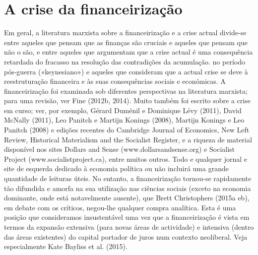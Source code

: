 \section{A crise da financeirização}
 \par 
Em geral, a literatura marxista sobre a financeirização e a crise actual divide-se entre aqueles que pensam que as finanças são cruciais e aqueles que pensam que não o são, e entre aqueles que argumentam que a crise actual é uma consequência retardada do fracasso na resolução das contradições da acumulação. no período pós-guerra («keynesiano») e aqueles que consideram que a actual crise se deve à reestruturação financeira e às suas consequências sociais e económicas. A financeirização foi examinada sob diferentes perspectivas na literatura marxista; para uma revisão, ver Fine (2012b, 2014). Muito também foi escrito sobre a crise em curso; ver, por exemplo, Gérard Duménil e Dominique Lévy (2011), David McNally (2011), Leo Panitch e Martijn Konings (2008), Martijn Konings e Leo Panitch (2008) e edições recentes do Cambridge Journal of Economics, New Left Review, Historical Materialism and the Socialist Register, e a riqueza de material disponível nos sites Dollars and Sense (www.dollarsandsense.org) e Socialist Project (www.socialistproject.ca), entre muitos outros. Todo e qualquer jornal e site de esquerda dedicado à economia política ou não incluirá uma grande quantidade de leituras úteis. No entanto, a financeirização tornou-se rapidamente tão difundida e amorfa na sua utilização nas ciências sociais (exceto na economia dominante, onde está notavelmente ausente), que Brett Christophers (2015a eb), em debate com os críticos, negou-lhe qualquer compra analítica. Esta é uma posição que consideramos insustentável uma vez que a financeirização é vista em termos da expansão extensiva (para novas áreas de actividade) e intensiva (dentro das áreas existentes) do capital portador de juros num contexto neoliberal. Veja especialmente Kate Bayliss et al. (2015).
 \par 
